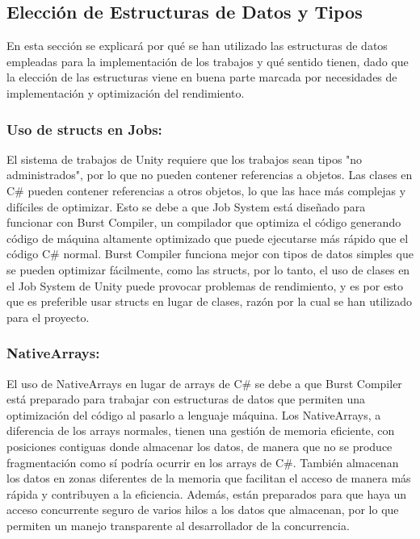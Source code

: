 \subsection{Elección de Estructuras de Datos y Tipos}

En esta sección se explicará por qué se han utilizado las estructuras de datos empleadas para la implementación de los trabajos y qué sentido tienen, dado que la elección de las estructuras viene en buena parte marcada por necesidades de implementación y optimización del rendimiento.

\subsubsection{Uso de structs en Jobs:}
El sistema de trabajos de Unity requiere que los trabajos sean tipos "no administrados", por lo que no pueden contener referencias a objetos. Las clases en C\# pueden contener referencias a otros objetos, lo que las hace más complejas y difíciles de optimizar. Esto se debe a que Job System está diseñado para funcionar con Burst Compiler, un compilador que optimiza el código generando código de máquina altamente optimizado que puede ejecutarse más rápido que el código C\# normal. Burst Compiler funciona mejor con tipos de datos simples que se pueden optimizar fácilmente, como las structs, por lo tanto, el uso de clases en el Job System de Unity puede provocar problemas de rendimiento, y es por esto que es preferible usar structs en lugar de clases, razón por la cual se han utilizado para el proyecto.

\subsubsection{NativeArrays:} 
El uso de NativeArrays en lugar de arrays de C\# se debe a que Burst Compiler está preparado para trabajar con estructuras de datos que permiten una optimización del código al pasarlo a lenguaje máquina. Los NativeArrays, a diferencia de los arrays normales, tienen una gestión de memoria eficiente, con posiciones contiguas donde almacenar los datos, de manera que no se produce fragmentación como sí podría ocurrir en los arrays de C\#. También almacenan los datos en zonas diferentes de la memoria que facilitan el acceso de manera más rápida y contribuyen a la eficiencia. Además, están preparados para que haya un acceso concurrente seguro de varios hilos a los datos que almacenan, por lo que permiten un manejo transparente al desarrollador de la concurrencia.

